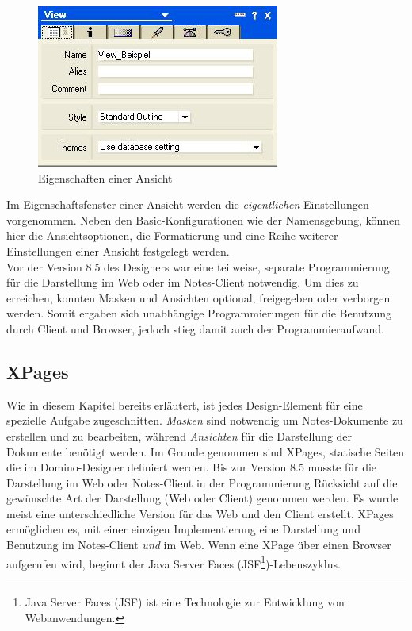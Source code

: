 \begin{figure}[H]
    \centerline{\includegraphics[scale=0.7]{pics/view}}
    \caption[Eigenschafts-Fenster für Ansichten]{\label{FiG:View_Control }
	Eigenschaften einer Ansicht}
\end{figure}
Im Eigenschaftsfenster einer Ansicht werden die \textit{eigentlichen} Einstellungen vorgenommen. 
Neben den Basic-Konfigurationen wie der Namensgebung,
können hier die Ansichtsoptionen, die Formatierung und eine Reihe weiterer Einstellungen einer Ansicht festgelegt werden.\\ 

Vor der Version 8.5 des Designers war eine teilweise, separate Programmierung für die Darstellung im Web oder im Notes-Client notwendig. 
Um dies zu erreichen, konnten Masken und Ansichten optional, freigegeben oder verborgen werden. Somit ergaben sich unabhängige Programmierungen für die 
Benutzung durch Client und Browser, jedoch stieg damit auch der Programmieraufwand.



\subsection{XPages}
\label{sec:4designelemente} 

Wie in diesem Kapitel bereits erläutert, ist jedes Design-Element für eine spezielle Aufgabe zugeschnitten.
\textit{Masken} sind notwendig um Notes-Dokumente zu erstellen und zu bearbeiten, während \textit{Ansichten} für die Darstellung 
der Dokumente benötigt werden.
Im Grunde genommen sind XPages, statische Seiten die im Domino-Designer definiert werden.
Bis zur Version 8.5 musste f\"ur die Darstellung im Web oder Notes-Client in der Programmierung R\"ucksicht auf die gew\"unschte Art der Darstellung
 (Web oder Client) genommen werden. Es wurde meist eine unterschiedliche Version f\"ur das Web und den Client erstellt.\newline
XPages ermöglichen es, mit einer einzigen Implementierung eine Darstellung und Benutzung im Notes-Client \textit{und} im Web.
Wenn eine XPage über einen Browser aufgerufen wird, beginnt der Java Server Faces (JSF\footnote{Java Server Faces (JSF) ist eine Technologie zur Entwicklung von
Webanwendungen\cite{marinschek}.})-Lebenszyklus\cite{donelly}.\newline


